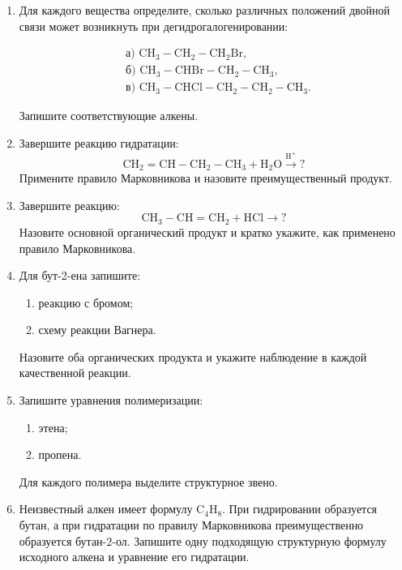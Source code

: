 \documentclass[a4paper,12pt]{article}
\begin{document}
\begin{enumerate}[resume]

\item Для каждого вещества определите, сколько различных положений двойной связи может возникнуть при дегидрогалогенировании:

\[
\begin{aligned}
&\text{а) }\mathrm{CH_3-CH_2-CH_2Br},\\
&\text{б) }\mathrm{CH_3-CHBr-CH_2-CH_3},\\
&\text{в) }\mathrm{CH_3-CHCl-CH_2-CH_2-CH_3}.
\end{aligned}
\]

Запишите соответствующие алкены.

\item Завершите реакцию гидратации:
\[
\mathrm{CH_2=CH-CH_2-CH_3+H_2O}
\xrightarrow{\mathrm{H^+}} ?
\]
Примените правило Марковникова и назовите преимущественный продукт.

\item Завершите реакцию:
\[
\mathrm{CH_3-CH=CH_2+HCl}
\longrightarrow ?
\]
Назовите основной органический продукт и кратко укажите, как применено правило Марковникова.

\item Для бут-2-ена запишите:

\begin{enumerate}[label=\alph*)]
    \item реакцию с бромом;
    \item схему реакции Вагнера.
\end{enumerate}

Назовите оба органических продукта и укажите наблюдение в каждой качественной реакции.

\item Запишите уравнения полимеризации:

\begin{enumerate}[label=\alph*)]
    \item этена;
    \item пропена.
\end{enumerate}

Для каждого полимера выделите структурное звено.

\item Неизвестный алкен имеет формулу \(\mathrm{C_4H_8}\). При гидрировании образуется бутан, а при гидратации по правилу Марковникова преимущественно образуется бутан-2-ол. Запишите одну подходящую структурную формулу исходного алкена и уравнение его гидратации.

\end{enumerate}
\end{document}
